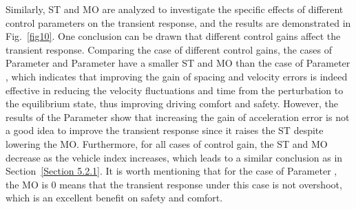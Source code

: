 \documentclass[journal]{IEEEtran}
\begin{document}
Similarly, ST and MO are analyzed to investigate the specific effects of different control parameters on the transient response, and the results are demonstrated in Fig.~\ref{fig10}. One conclusion can be drawn that different control gains affect the transient response. Comparing the case of different control gains, the cases of Parameter \uppercase\expandafter{} and Parameter \uppercase\expandafter{} have a smaller ST and MO than the case of Parameter \uppercase\expandafter{}, which indicates that improving the gain of spacing and velocity errors is indeed effective in reducing the velocity fluctuations and time from the perturbation to the equilibrium state, thus improving driving comfort and safety. However, the results of the Parameter \uppercase\expandafter{} show that increasing the gain of acceleration error is not a good idea to improve the transient response since it raises the ST despite lowering the MO. Furthermore, for all cases of control gain, the ST and MO decrease as the vehicle index increases, which leads to a similar conclusion as in Section~\ref{Section 5.2.1}. It is worth mentioning that for the case of Parameter \uppercase\expandafter{}, the MO is 0 means that the transient response under this case is not overshoot, which is an excellent benefit on safety and comfort.



\end{document}
